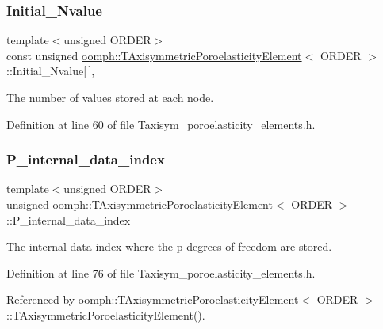 \subsubsection{\texorpdfstring{Initial\+\_\+\+Nvalue}{Initial\_Nvalue}}
{\footnotesize\ttfamily template$<$unsigned O\+R\+D\+ER$>$ \\
const unsigned \hyperlink{classoomph_1_1TAxisymmetricPoroelasticityElement}{oomph\+::\+T\+Axisymmetric\+Poroelasticity\+Element}$<$ O\+R\+D\+ER $>$\+::Initial\+\_\+\+Nvalue\mbox{[}$\,$\mbox{]}\hspace{0.3cm}{\ttfamily [static]}, {\ttfamily [private]}}



The number of values stored at each node. 



Definition at line 60 of file Taxisym\+\_\+poroelasticity\+\_\+elements.\+h.

\mbox{\label{classoomph_1_1TAxisymmetricPoroelasticityElement_a439e9489d185eeae1b1085dde8ae0e7d}} 
\subsubsection{\texorpdfstring{P\+\_\+internal\+\_\+data\+\_\+index}{P\_internal\_data\_index}}
{\footnotesize\ttfamily template$<$unsigned O\+R\+D\+ER$>$ \\
unsigned \hyperlink{classoomph_1_1TAxisymmetricPoroelasticityElement}{oomph\+::\+T\+Axisymmetric\+Poroelasticity\+Element}$<$ O\+R\+D\+ER $>$\+::P\+\_\+internal\+\_\+data\+\_\+index\hspace{0.3cm}{\ttfamily [private]}}



The internal data index where the p degrees of freedom are stored. 



Definition at line 76 of file Taxisym\+\_\+poroelasticity\+\_\+elements.\+h.



Referenced by oomph\+::\+T\+Axisymmetric\+Poroelasticity\+Element$<$ O\+R\+D\+E\+R $>$\+::\+T\+Axisymmetric\+Poroelasticity\+Element().

